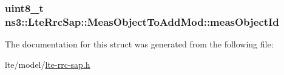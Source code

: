 \subsubsection[{\texorpdfstring{meas\+Object\+Id}{measObjectId}}]{\setlength{\rightskip}{0pt plus 5cm}uint8\+\_\+t ns3\+::\+Lte\+Rrc\+Sap\+::\+Meas\+Object\+To\+Add\+Mod\+::meas\+Object\+Id}\hypertarget{structns3_1_1LteRrcSap_1_1MeasObjectToAddMod_a74ed90f3f7d58fb7f292244df4f7cdd2}{}\label{structns3_1_1LteRrcSap_1_1MeasObjectToAddMod_a74ed90f3f7d58fb7f292244df4f7cdd2}


The documentation for this struct was generated from the following file\+:\begin{DoxyCompactItemize}
\item 
lte/model/\hyperlink{lte-rrc-sap_8h}{lte-\/rrc-\/sap.\+h}\end{DoxyCompactItemize}
